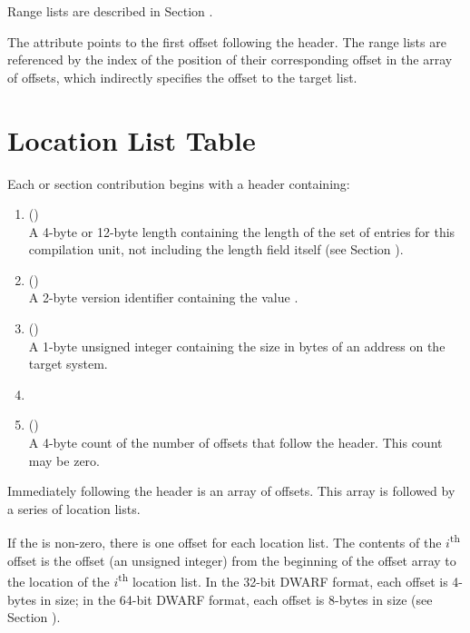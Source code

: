 Range lists are
described in Section .
\db

The \DWATrnglistsbase{} attribute points to the first offset 
following the header. The range lists are referenced
by the index of the position of their corresponding offset in the
array of offsets, which indirectly specifies the offset to the
target list.
 
\section{Location List Table}
\label{datarep:locationlisttable}
Each \dotdebugloclists{} or \dotdebugloclistsdwo{} section
\bb
contribution
\eb
begins with a header containing:
\begin{enumerate}[1. ]
\item \HFNunitlength{} () \\
A 4-byte or 12-byte length containing the length of
the set of entries for this compilation unit, not
including the length field itself
\bb
(see Section ).
\eb

\item  \HFNversion{} (\HFTuhalf) \\
A 2-byte version identifier containing the value
\versiondotdebugloclists{}.

\item	\HFNaddresssize{} (\HFTubyte) \\
A 1-byte unsigned integer containing the size in
bytes of an address 
\db
on the target system.

\item	\HFNreservedwassegmentselectorsize{} 
\db
\\

\item   \HFNoffsetentrycount{} (\HFTuword) \\
A 4-byte count of the number of offsets
that follow the header. This count may be zero.
\end{enumerate}

Immediately following the header is an array of offsets.
This array is followed by a series of location lists. 

If the \HFNoffsetentrycount{} is non-zero, there 
is one offset for each location list. The contents
of the $i$\textsuperscript{th} offset is the offset 
(an unsigned integer) from the
beginning of the offset array to the location of the 
$i$\textsuperscript{th} location list. 
In the 32-bit DWARF format, each offset is 4-bytes in size; 
in the 64-bit DWARF format, each offset is 8-bytes in size 
(see Section ).

